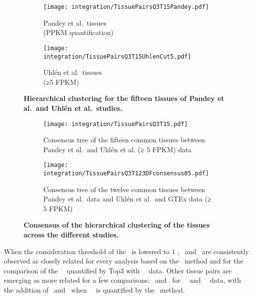 \begin{figure}[!htpb]
    \begin{subfigure}[b]{0.53\textwidth}
        \captionsetup{margin=0.6cm,justification=centering}
        \centering \texttt{[image: integration/TissuePairsQ3T15Pandey.pdf]}
        \caption{Pandey et al.\ tissues\\(PPKM quantification)}\label{fig:treePandeyQ3T15}
    \end{subfigure}%
    \begin{subfigure}[b]{0.53\textwidth}
        \captionsetup{margin=0.6cm,justification=centering}
        \centering \texttt{[image: integration/TissuePairsQ3T15UhlenCut5.pdf]}
        \caption{Uhlén et al.\ tissues\\(≥5 FPKM)}\label{fig:treeUhlenQ3T15cuth5}
    \end{subfigure}
    \vspace{-5mm}
    \caption[Tissues hierachical clustering for Pandey and Uhlén]{\label{fig:separateTree}%
    \textbf{Hierarchical clustering for the fifteen tissues of
    Pandey et al.\ and Uhlén et al.\ studies.}
    }
\end{figure}

\begin{figure}[!htpb]
    \begin{subfigure}[b]{0.53\textwidth}
        \captionsetup{margin=0.6cm}
        \centering \texttt{[image: integration/TissuePairsQ3T15.pdf]}
        \caption{Consensus tree of the fifteen common tissues between Pandey et al.\
        and Uhlén et al. (≥ $5$ FPKM) data}\label{fig:consensus2D15TQ3}
    \end{subfigure}%
    \begin{subfigure}[b]{0.53\textwidth}
        \captionsetup{margin=0.6cm}
        \centering \texttt{[image: integration/TissuePairsQ3T123DFconsensus05.pdf]}
        \caption{Consensus tree of the twelve common tissues
        between Pandey et al.\ data and
        Uhlén et al.\ and GTEx data (≥ $5$ FPKM)}\label{fig:consensusTree05}
    \end{subfigure}
    \vspace{-5mm}
    \caption[Tissues hierachical clustering for Pandey and Uhlén]{\label{fig:consensusTrees}%
    \textbf{Consensus of the hierarchical clustering of the tissues across the different studies.}
    }
\end{figure}

When the consideration threshold of the \mRNAs\ is lowered to $1$ \FPKM,
\Liver\ and \Kidney\ are consistently observed as closely related
for every analysis based on the \PPKM\ method and
for the comparison of
the \pandey\ \etal\ quantified by Top3 with \uhlen\ \etal\ data.
Other tissue pairs are emerging as more related for a few comparisons:
\Rectum\ and \hColon\ for \pandey\ \etal\ and \uhlen\ \etal\ data,
with the addition of \Pancreas\ and \Gall\
when \pandey\ \etal\ is quantified by the \PPKM\ method.

